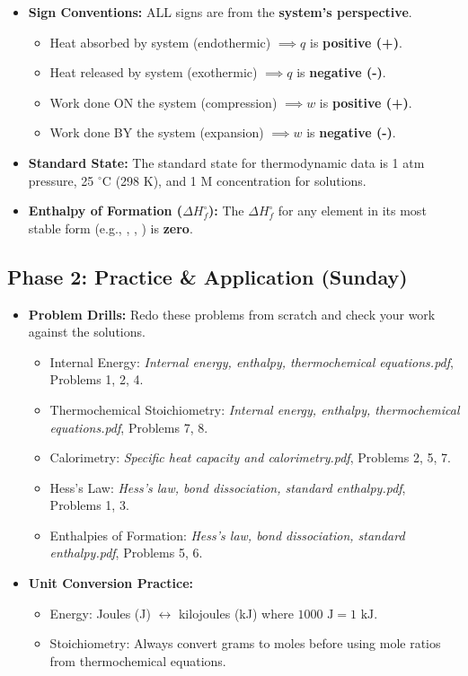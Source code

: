 \documentclass{article}
\begin{document}
\begin{itemize}
    \begin{itemize}
        \item \textbf{Sign Conventions:} ALL signs are from the \textbf{system's perspective}.
            \begin{itemize}
                \item Heat absorbed by system (endothermic) $\implies q$ is \textbf{positive (+)}.
                \item Heat released by system (exothermic) $\implies q$ is \textbf{negative (-)}.
                \item Work done ON the system (compression) $\implies w$ is \textbf{positive (+)}.
                \item Work done BY the system (expansion) $\implies w$ is \textbf{negative (-)}.
            \end{itemize}
        \item \textbf{Standard State:} The standard state for thermodynamic data is 1 atm pressure, 25 $^\circ$C (298 K), and 1 M concentration for solutions.
        \item \textbf{Enthalpy of Formation ($\Delta H_f^\circ$):} The $\Delta H_f^\circ$ for any element in its most stable form (e.g., , , ) is \textbf{zero}.
    \end{itemize}
\end{itemize}

\subsection{Phase 2: Practice \& Application (Sunday)}
\begin{itemize}
    \item \textbf{Problem Drills:} Redo these problems from scratch and check your work against the solutions.
    \begin{itemize}
        \item Internal Energy: \textit{Internal energy, enthalpy, thermochemical equations.pdf}, Problems 1, 2, 4.
        \item Thermochemical Stoichiometry: \textit{Internal energy, enthalpy, thermochemical equations.pdf}, Problems 7, 8.
        \item Calorimetry: \textit{Specific heat capacity and calorimetry.pdf}, Problems 2, 5, 7.
        \item Hess's Law: \textit{Hess's law, bond dissociation, standard enthalpy.pdf}, Problems 1, 3.
        \item Enthalpies of Formation: \textit{Hess's law, bond dissociation, standard enthalpy.pdf}, Problems 5, 6.
    \end{itemize}
    \item \textbf{Unit Conversion Practice:}
    \begin{itemize}
        \item Energy: Joules (J) $\leftrightarrow$ kilojoules (kJ) where $1000 \text{ J} = 1 \text{ kJ}$.
        \item Stoichiometry: Always convert grams to moles before using mole ratios from thermochemical equations.
    \end{itemize}
\end{itemize}
\end{document}
